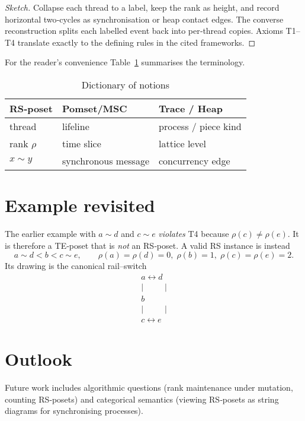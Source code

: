 \documentclass{article}
\begin{document}
\begin{proof}[Sketch]
Collapse each thread to a label, keep the rank as height, and record
horizontal two‑cycles as synchronisation or heap contact edges.  The
converse reconstruction splits each labelled event back into per‑thread
copies.  Axioms T1--T4 translate exactly to the defining rules in the
cited frameworks.
\end{proof}

For the reader's convenience Table~\ref{tab:dictionary} summarises the
terminology.

\begin{table}[h]
  \centering
  \begin{tabular}{l|l|l}
    RS‑poset & Pomset/MSC & Trace / Heap \\
    \hline
    thread & lifeline & process / piece kind \\
    rank $\rho$ & time slice & lattice level \\
    $x\sim y$ & synchronous message & concurrency edge
  \end{tabular}
  \caption{Dictionary of notions}
  \label{tab:dictionary}
\end{table}

\section{Example revisited}

The earlier example with $a\sim d$ and $c\sim e$ \emph{violates}
T4 because $\rho(c)\neq\rho(e)$.  It is therefore a TE‑poset that is
\emph{not} an RS‑poset.  A valid RS instance is instead
\[
  a\sim d< b < c\sim e,
\qquad
  \rho(a)=\rho(d)=0,\;\rho(b)=1,\;\rho(c)=\rho(e)=2.
\]
Its drawing is the canonical rail--switch
\[
  \begin{array}{c}
    a\longleftrightarrow d \\
    |\quad\;\;\quad| \\
    b\quad\;\;\quad  \\
    |\quad\;\;\quad| \\
    c\longleftrightarrow e
  \end{array}
\]

\section{Outlook}

Future work includes algorithmic questions (rank maintenance under
mutation, counting RS‑posets) and categorical semantics (viewing
RS‑posets as string diagrams for synchronising processes).
\end{document}
